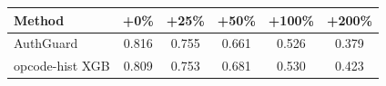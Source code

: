 \begin{tabular}{lccccc}
\toprule
Method & +0\% & +25\% & +50\% & +100\% & +200\% \\
\midrule
AuthGuard & 0.816 & 0.755 & 0.661 & 0.526 & 0.379 \\
opcode-hist XGB & 0.809 & 0.753 & 0.681 & 0.530 & 0.423 \\
\bottomrule
\end{tabular}
